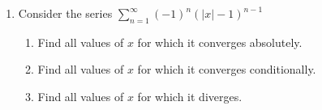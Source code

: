 \documentclass[11pt]{article}
\begin{document}
\begin{enumerate}
  \item Consider the series $\displaystyle \sum_{n=1}^\infty (-1)^n(|x|-1)^{n-1}$
  \begin{enumerate}
    \item Find all values of $x$ for which it converges absolutely.
    \item Find all values of $x$ for which it converges conditionally.
    \item Find all values of $x$ for which it diverges.
  \end{enumerate}

\end{enumerate}
\end{document}
